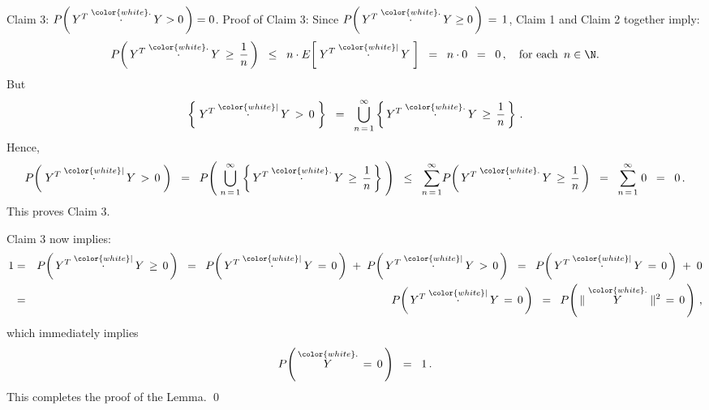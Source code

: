 \vskip 0.5cm
\noindent
\textnormal{Claim 3:}\quad
$P\!\left(\,Y^{T} \overset{{\color{white}.}}{\cdot} Y > 0\,\right) = 0$.
\vskip 0.3cm
\noindent
Proof of Claim 3:\quad
Since $P\!\left(\,Y^{T} \overset{{\color{white}.}}{\cdot} Y \geq 0\,\right)\,=\,1$,
Claim 1 and Claim 2 together imply:
\begin{equation*}
P\!\left(\,Y^{T} \overset{{\color{white}.}}{\cdot} Y \,\geq\, \dfrac{1}{n}\,\right)
\;\; \leq \;\; n \cdot E\!\left[\;Y^{T} \overset{{\color{white}\vert}}{\cdot} Y\;\right]
\;\; = \;\; n \cdot 0
\;\; = \;\; 0\,,
\quad
\textnormal{for each \,$n \in \N$}.
\end{equation*}
But
\begin{equation*}
\left\{\; Y^{T} \overset{{\color{white}\vert}}{\cdot} Y \,>\, 0 \;\right\}
\;\; = \;\;
	\overset{\infty}{\underset{n\,=\,1}{\bigcup}} \left\{\, Y^{T} \overset{{\color{white}.}}{\cdot} Y \,\geq\, \dfrac{1}{n}\,\right\}\,.
\end{equation*}
Hence,
\begin{equation*}
P\!\left(\; Y^{T} \overset{{\color{white}\vert}}{\cdot} Y \,>\, 0 \;\right)
\;\; = \;\;
	P\!\left(\;
		\overset{\infty}{\underset{n\,=\,1}{\bigcup}} \left\{\, Y^{T} \overset{{\color{white}.}}{\cdot} Y \,\geq\, \dfrac{1}{n}\,\right\}
		\;\right)
\;\; \leq \;\;
	\overset{\infty}{\underset{n\,=\,1}{\sum}} P\!\left(\, Y^{T} \overset{{\color{white}.}}{\cdot} Y \,\geq\, \dfrac{1}{n}\,\right)
\;\; = \;\;
	\overset{\infty}{\underset{n\,=\,1}{\sum}}\;0
\;\; = \;\; 0\,.
\end{equation*}
This proves Claim 3.

\vskip 0.5cm
\noindent
Claim 3 now implies:
\begin{eqnarray*}
1
& = & P\!\left(\,Y^{T} \overset{{\color{white}\vert}}{\cdot} Y \,\geq\, 0\,\right)
\;\; = \;\;
	P\!\left(\,Y^{T} \overset{{\color{white}\vert}}{\cdot} Y \,=\, 0\,\right)
	\; + \;
	P\!\left(\,Y^{T} \overset{{\color{white}\vert}}{\cdot} Y \,>\, 0\,\right)
\;\; = \;\;
	P\!\left(\,Y^{T} \overset{{\color{white}\vert}}{\cdot} Y \,=\, 0\,\right)
	\; + \; 0
\\
& = &
	P\!\left(\,Y^{T} \overset{{\color{white}\vert}}{\cdot} Y \,=\, 0\,\right)
\;\; = \;\;
	P\!\left(\, \Vert\;\overset{{\color{white}.}}{Y}\;\Vert^{2} \,=\, 0\,\right)\,,
\end{eqnarray*}
which immediately implies
\begin{equation*}
P\!\left(\, \overset{{\color{white}.}}{Y} \,=\, 0\,\right)
\;\; = \;\; 1\,.
\end{equation*}
This completes the proof of the Lemma.
\qed

